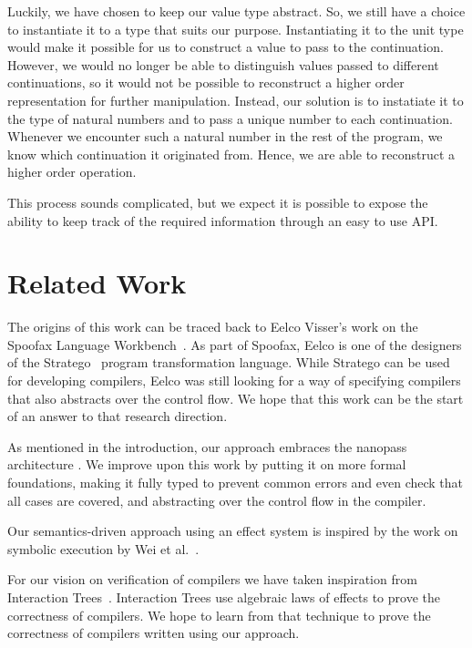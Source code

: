 \documentclass[a4paper,UKenglish,cleveref, autoref, thm-restate, anonymous]{oasics-v2021}
\begin{document}
Luckily, we have chosen to keep our value type abstract.
So, we still have a choice to instantiate it to a type that suits our purpose.
Instantiating it to the unit type would make it possible for us to construct a value to pass to the continuation.
However, we would no longer be able to distinguish values passed to different continuations, so it would not be possible to reconstruct a higher order representation for further manipulation.
Instead, our solution is to instatiate it to the type of natural numbers and to pass a unique number to each continuation.
Whenever we encounter such a natural number in the rest of the program, we know which continuation it originated from.
Hence, we are able to reconstruct a higher order operation.

This process sounds complicated, but we expect it is possible to expose the ability to keep track of the required information through an easy to use API. 

\section{Related Work}\label{sec:related}

The origins of this work can be traced back to Eelco Visser's work on the Spoofax Language Workbench~\cite{6898704}. 
As part of Spoofax, Eelco is one of the designers of the Stratego~\cite{10.1007/3-540-45127-7_27} program transformation language. 
While Stratego can be used for developing compilers, Eelco was still looking for a way of specifying compilers that also abstracts over the control flow.
We hope that this work can be the start of an answer to that research direction.

As mentioned in the introduction, our approach embraces the nanopass architecture \cite{10.1145/1016850.1016878, 10.1145/2544174.2500618}.
We improve upon this work by putting it on more formal foundations, making it fully typed to prevent common errors and even check that all cases are covered, and abstracting over the control flow in the compiler.

Our semantics-driven approach using an effect system is inspired by the work on symbolic execution by Wei et al.~\cite{10.1145/3428232}.

For our vision on verification of compilers we have taken inspiration from Interaction Trees~\cite{10.1145/3371119}.
Interaction Trees use algebraic laws of effects to prove the correctness of compilers.
We hope to learn from that technique to prove the correctness of compilers written using our approach.
\end{document}
